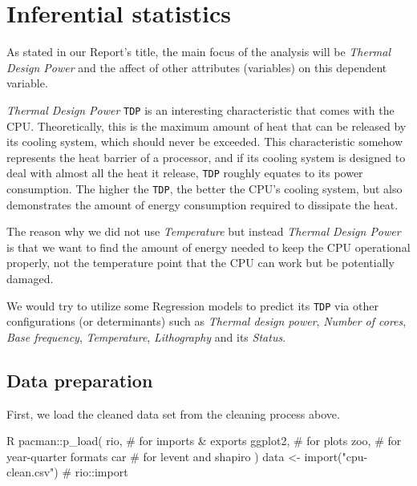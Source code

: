 %
%   
\section{Inferential statistics}
\label{section:infer_stats}

As stated in our Report's title, the main focus of the analysis will be \textit{Thermal Design Power} and the affect of
other attributes (variables) on this dependent variable.

\textit{Thermal Design Power} \verb|TDP| is an interesting characteristic that comes with the CPU. Theoretically, this is the
maximum amount of heat that can be released by its cooling system, which should never be exceeded. This characteristic somehow
represents the heat barrier of a processor, and if its cooling system is designed to deal with almost all the heat it release,
\verb|TDP| roughly equates to its power consumption. The higher the \verb|TDP|, the better the CPU's cooling system, but also 
demonstrates the amount of energy consumption required to dissipate the heat.

The reason why we did not use \textit{Temperature} but instead \textit{Thermal Design Power} is that we want to find the amount of
energy needed to keep the CPU operational properly, not the temperature point that the CPU can work but be potentially damaged.

We would try to utilize some Regression models to predict its \verb|TDP| via other configurations (or determinants) such as
\textit{Thermal design power}, \textit{Number of cores}, \textit{Base frequency}, \textit{Temperature}, \textit{Lithography} and its \textit{Status}.



\subsection{Data preparation}

First, we load the cleaned data set from the cleaning process above.

\begin{code}{R}
pacman::p_load(
    rio,     # for imports & exports
    ggplot2, # for plots
    zoo,      # for year-quarter formats
    car     # for levent and shapiro
)
data <- import("cpu-clean.csv") # rio::import
\end{code} 

